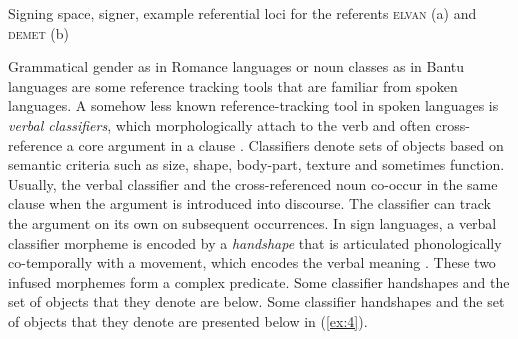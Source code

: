 \documentclass[review]{elsarticle} %
\begin{document}
    \begin{exe}
    \ex \label{ex:3} Signing space, signer, example referential loci for the referents \textsc{elvan} (a) and \textsc{demet} (b) \\

    \end{exe}

Grammatical gender as in Romance languages or noun classes as in Bantu
languages are some reference tracking tools that are familiar from
spoken languages. A somehow less known reference-tracking tool in spoken
languages is \emph{verbal classifiers}, which morphologically attach to
the verb and often cross-reference a core argument in a clause
\citep{aikhenvald2017}. Classifiers denote sets of objects based on
semantic criteria such as size, shape, body-part, texture and sometimes
function. Usually, the verbal classifier and the cross-referenced noun
co-occur in the same clause when the argument is introduced into
discourse. The classifier can track the argument on its own on
subsequent occurrences. In sign languages, a verbal classifier morpheme
is encoded by a \emph{handshape} that is articulated phonologically
co-temporally with a movement, which encodes the verbal meaning
\citep{supalla1990, benedicto2004}. These two infused morphemes form a
complex predicate. Some classifier handshapes and the set of objects
that they denote are below. Some classifier handshapes and the set of
objects that they denote are presented below in (\ref{ex:4}).
\end{document}
